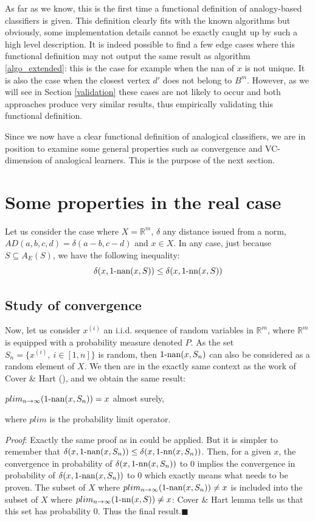 {As far as we know, this is the first time a functional definition of
analogy-based classifiers is given. This definition clearly fits with the known
algorithms but obviously, some implementation details cannot be exactly caught
up by such a high level description. It is indeed possible to find a few edge
cases where this functional definition may not output the same result as
algorithm \ref{algo_extended}: this is the case for example when the nan of $x$
is not unique. It is
also the case when the closest vertex $d'$ does not belong to $B^m$.  However,
as we will see in Section \ref{validation} these cases are not likely to occur
and both approaches produce very similar results, thus empirically validating
this functional definition.

Since we now have a clear functional definition of analogical classifiers, we
are in position to examine some general properties such as convergence and
VC-dimension of analogical learners. This is the purpose of the next section.

\section{Some properties in the real case}\label{convergence}
Let us consider the case where $X=\mathbb{R}^m$, $\delta$ any distance issued
from a norm, $AD(a,b,c,d)=\delta(a-b,c-d)$ and $x \in X$.  In any case, just
because $S \subseteq A_E(S)$, we have the following inequality:
$$\delta(x, 1\mbox{-nan}(x,S)) \leq \delta(x, 1\mbox{-nn}(x,S))$$

\subsection{Study of convergence}

Now, let us consider  $x^{(i)}$ an i.i.d. sequence of random variables in
$\mathbb{R}^m$, where $\mathbb{R}^m$ is equipped with a probability measure
denoted $P$. As the set $S_n=\{x^{(i)}, ~ i \in [1, n]\}$ is random, then
$1\mbox{-nan}(x,S_n)$ can also be considered as a random element of $X$.  We then are
in the exactly same context as the work of Cover \& Hart (\cite{CovHarTIT67}), and
we obtain the same result:
\begin{property}\label{propconvergence}
$plim_{n \to \infty}(1\mbox{-nan}(x,S_n))=x$ almost surely,
\end{property}
where $plim$ is the probability limit operator.

{\it Proof}:
Exactly the same proof  as in \cite{CovHarTIT67} could be applied.  But it is
simpler to remember that $\delta(x, 1\mbox{-nan}(x,S_n)) \leq \delta(x, 1\mbox{-nn}(x,S_n))$. Then,
for a given $x$, the convergence in probability of $\delta(x,
1\mbox{-nn}(x,S_n))$ to $0$ implies the convergence in probability of $\delta(x,
1\mbox{-nan}(x,S_n))$ to $0$ which exactly means what needs to be proven.
The subset of $X$ where $plim_{n \to \infty}(1\mbox{-nan}(x,S_n))\neq
x$ is included into the subset of $X$ where $plim_{n \to \infty}(1\mbox{-nn}(x,S))\neq x$:
Cover \& Hart lemma tells us that this set has probability $0$. Thus the final
result.\hfill $\blacksquare$\\

}
